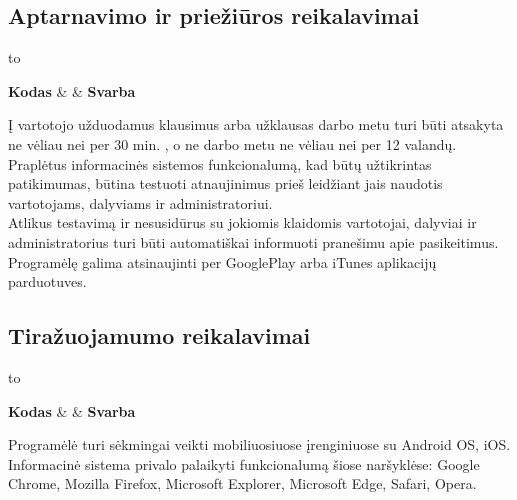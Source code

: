 \documentclass{VUMIFPSkursinis}
\begin{document}
\subsection*{Aptarnavimo ir priežiūros reikalavimai}
  \begin{longtabu} to 
    \caption{Aptarnavimo ir priežiūros reikalavimai}
    \label{table:aptarnavimoIrPrieziurosReikalavimai}
    \endfirsthead
    \endhead
    \hline
    \textbf{Kodas} &  & \textbf{Svarba} \\
    \hline

	{
		Į vartotojo užduodamus klausimus arba užklausas darbo metu turi būti atsakyta ne vėliau nei per 30 min. , o ne darbo metu ne vėliau nei per 12 valandų. \\
		Praplėtus informacinės sistemos funkcionalumą, kad būtų užtikrintas patikimumas, būtina testuoti atnaujinimus prieš leidžiant jais naudotis vartotojams, dalyviams ir administratoriui. \\
		Atlikus testavimą ir nesusidūrus su jokiomis klaidomis vartotojai, dalyviai  ir administratorius turi būti automatiškai informuoti pranešimu apie pasikeitimus.\\
		Programėlę galima atsinaujinti per GooglePlay arba iTunes aplikacijų parduotuves.
	}
	
  \end{longtabu}
	
\subsection*{Tiražuojamumo reikalavimai}
  \begin{longtabu} to 
    \caption{Tiražuojamumo reikalavimai}
    \label{table:tirazuojamumoReikalavimai}
    \endfirsthead
    \endhead
    \hline
    \textbf{Kodas} &  & \textbf{Svarba} \\
    \hline
	
	{
		Programėlė turi sėkmingai veikti mobiliuosiuose įrenginiuose su Android OS, iOS. \\
		Informacinė sistema privalo palaikyti funkcionalumą šiose naršyklėse: Google Chrome, Mozilla Firefox, Microsoft Explorer, Microsoft Edge, Safari, Opera.
	}
	
  \end{longtabu}
\end{document}
